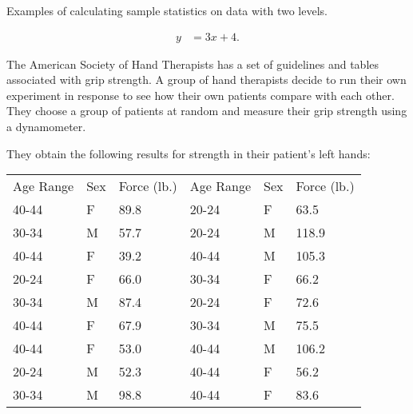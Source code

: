 


\begin{problem}
\item Examples of calculating sample statistics on data with two levels.

  \begin{subproblem}
  \item 
    \begin{eqnarray}
      y & = 3x + 4.
    \end{eqnarray}
    \vfill
  \end{subproblem}


\end{problem}




The American Society of Hand Therapists has a set of guidelines and
tables associated with grip strength. A group of hand therapists
decide to run their own experiment in response to see how their own
patients compare with each other. They choose a group of patients at
random and measure their grip strength using a dynamometer.

They obtain the following results for strength in their patient's
left hands: \\
\begin{tabular}{lll@{\hspace{4em}}lll}
Age Range & Sex & Force (lb.) & Age Range & Sex & Force (lb.) \\
40-44 & F & 89.8 & 20-24 & F & 63.5 \\
30-34 & M & 57.7 & 20-24 & M & 118.9 \\
40-44 & F & 39.2 & 40-44 & M & 105.3 \\
20-24 & F & 66.0 & 30-34 & F & 66.2 \\
30-34 & M & 87.4 & 20-24 & F & 72.6 \\
40-44 & F & 67.9 & 30-34 & M & 75.5 \\
40-44 & F & 53.0 & 40-44 & M & 106.2 \\
20-24 & M & 52.3 & 40-44 & F & 56.2 \\
30-34 & M & 98.8 & 40-44 & F & 83.6
\end{tabular}

%
%


